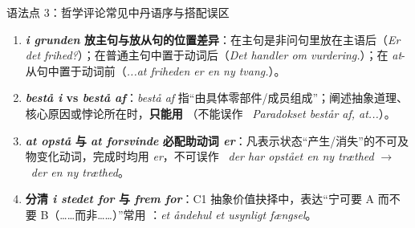 \begin{grammatikbox}{语法点 3：哲学评论常见中丹语序与搭配误区}
\begin{enumerate}
  \item \textbf{ \textit{i grunden} 放主句与放从句的位置差异}：在主句是非问句里放在主语后（\textit{Er det  frihed?}）；在普通主句中置于动词后（\textit{Det handler  om vurdering.}）；在 \textit{at}-从句中置于动词前（\textit{...at friheden  er en ny tvang.}）。
  \item \textbf{ \textit{bestå i} vs \textit{bestå af}}：\textit{bestå af} 指“由具体零部件/成员组成”；阐述抽象道理、核心原因或悖论所在时，\textbf{只能用 }（不能误作 \ \textit{Paradokset består af, at...}）。
  \item \textbf{ \textit{at opstå} 与 \textit{at forsvinde} 必配助动词 \textit{er}}：凡表示状态“产生/消失”的不可及物变化动词，完成时均用 \textit{er}，不可误作 \ \textit{der har opstået en ny træthed} $\rightarrow$ \ \textit{der  en ny træthed}。
  \item \textbf{ 分清 \textit{i stedet for} 与 \textit{frem for}}：C1 抽象价值抉择中，表达“宁可要 A 而不要 B（……而非……）”常用 ：\textit{et åndehul  et usynligt fængsel}。
\end{enumerate}
\end{grammatikbox}


